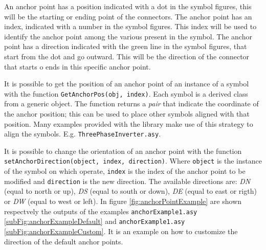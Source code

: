 \documentclass[a4paper,12pt]{report}
\begin{document}
An anchor point has a position indicated with a dot in the symbol figures, this will be the starting or ending point of the connectors. The anchor point has an index, indicated with a number in the symbol figures. This index will be used to identify the anchor point among the various present in the symbol. The anchor point has a direction indicated with the green line in the symbol figures, that start from the dot and go outward. This will be the direction of the connector that starts o ends in this specific anchor point.

It is possible to get the position of an anchor point of an instance of a symbol with the function \texttt{GetAnchorPos(obj, index)}. Each symbol is a derived class from a generic object. The function returns a \emph{pair} that indicate the coordinate of the anchor position; this can be used to place other symbols aligned with that position. Many examples provided with the library make use of this strategy to align the symbols. E.g. \texttt{ThreePhaseInverter.asy}.

It is possible to change the orientation of an anchor point with the function \texttt{setAnchorDirection(object, index, direction)}. Where \texttt{object} is the instance of the symbol on which operate, \texttt{index} is the index of the anchor point to be modified and \texttt{direction} is the new direction. The available directions are: \emph{DN} (equal to north or up), \emph{DS} (equal to south or down), \emph{DE} (equal to east or rigth) or \emph{DW} (equal to west or left). In figure \ref{fig:anchorPointExample} are shown respectvely the outputs of the examples \texttt{anchorExample1.asy} \ref{subFig:anchorExampleDefault} and \texttt{anchorExample1.asy} \ref{subFig:anchorExampleCustom}. It is an example on how to customize the direction of the default anchor points. 
\end{document}
